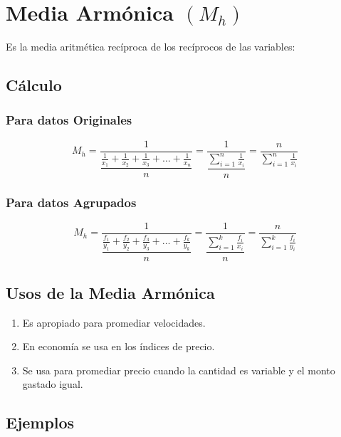 \section{Media Armónica $(M_h)$}
Es la media aritmética recíproca de los recíprocos de las variables:
\subsection{Cálculo}
\subsubsection{Para datos Originales}
$$M_h=\dfrac{1}{\dfrac{\frac{1}{x_1}+\frac{1}{x_2}+\frac{1}{x_3}+\ldots+\frac{1}{x_n} }{n}}=\dfrac{1}{\dfrac{\displaystyle\sum_{i=1}^{n}\frac{1}{x_i}}{n}}=\dfrac{n}{\displaystyle\sum_{i=1}^{n}\frac{1}{x_i}}$$
\subsubsection{Para datos Agrupados}
$$M_h=\dfrac{1}{\dfrac{\frac{f_1}{y_1}+\frac{f_2}{y_2}+\frac{f_3}{y_3}+\ldots+\frac{f_k}{y_k} }{n}}=\dfrac{1}{\dfrac{\displaystyle\sum_{i=1}^{k}\frac{f_i}{x_i}}{n}}=\dfrac{n}{\displaystyle\sum_{i=1}^{k}\frac{f_i}{y_i}}$$
\subsection{Usos de la Media Armónica}
\begin{enumerate}
\item Es apropiado para promediar velocidades.
\item En economía se usa en los índices de precio.
\item Se usa para promediar precio cuando la cantidad es variable y el monto gastado igual.
\end{enumerate}
\subsection{Ejemplos}